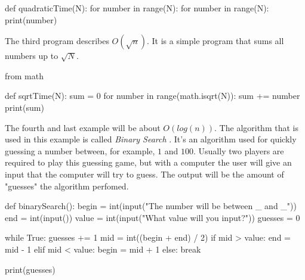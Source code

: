 \documentclass[main.tex]{subfiles}
\begin{document}
\begin{python}
    def quadraticTime(N):
        for number in range(N):
            for number in range(N):
                print(number)
\end{python}

\vspace{10mm}

The third program describes $O(\sqrt{n})$. It is a simple program that sums all numbers up to $\sqrt{N}$.

\begin{python}
    from math

    def sqrtTime(N):
        sum = 0
        for number in range(math.isqrt(N)):
            sum += number
        print(sum)
\end{python}

\vspace{10mm}

The fourth and last example will be about $O(log (n))$. The algorithm that is used in this example is called \textit{Binary Search} \cite{algh:binary_search}. It's an algorithm used for quickly guessing a number between, for example, $1$ and $100$. Usually two players are required to play this guessing game, but with a computer the user will give an input that the computer will try to guess. The output will be the amount of "guesses" the algorithm perfomed.

\begin{python}
    def binarySearch():
        begin = int(input("The number will be between _ and _\n"))
        end = int(input())
        value = int(input("What value will you input?\n"))
        guesses = 0

        while True:
            guesses += 1
            mid = int((begin + end) / 2)
            if mid > value:
                end = mid - 1
            elif mid < value:
                begin = mid + 1
            else:
                break

    print(guesses)

\end{python}

\end{document}
